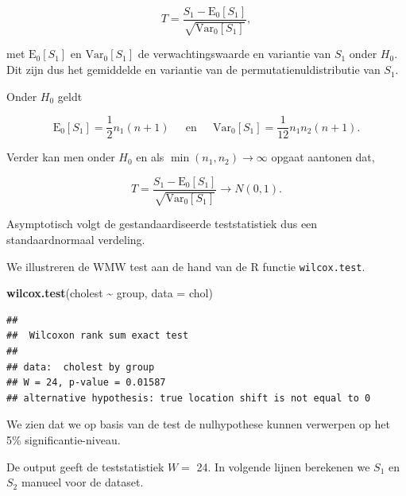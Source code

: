 \documentclass[
  12pt,dutch]{book}
\newenvironment{Shaded}{\begin{snugshade}}{\end{snugshade}}
\newcommand{\AttributeTok}[1]{\textcolor[rgb]{0.13,0.29,0.53}{#1}}
\newcommand{\FunctionTok}[1]{\textcolor[rgb]{0.13,0.29,0.53}{\textbf{#1}}}
\newcommand{\NormalTok}[1]{#1}
\newcommand{\SpecialCharTok}[1]{\textcolor[rgb]{0.81,0.36,0.00}{\textbf{#1}}}
\theoremstyle{definition}
\theoremstyle{definition}
\theoremstyle{definition}
\theoremstyle{definition}
\theoremstyle{remark}
\begin{document}
\[
  T = \frac{S_1-\text{E}_{0}\left[S_1\right]}{\sqrt{\text{Var}_{0}\left[S_1\right]}},
\]

met \(\text{E}_{0}\left[S_1\right]\) en \(\text{Var}_{0}\left[S_1\right]\) de verwachtingswaarde en variantie van \(S_1\) onder \(H_0\). Dit zijn dus het gemiddelde en variantie van de permutatienuldistributie van \(S_1\).

Onder \(H_0\) geldt

\[
   \text{E}_{0}\left[S_1\right]= \frac{1}{2}n_1(n+1) \;\;\;\;\text{ en }\;\;\;\; \text{Var}_{0}\left[S_1\right]=\frac{1}{12}n_1n_2(n+1).
 \]

Verder kan men onder \(H_0\) en als \(\min(n_1,n_2)\rightarrow \infty\) opgaat aantonen dat,

\[
    T = \frac{S_1-\text{E}_{0}\left[S_1\right]}{\sqrt{\text{Var}_{0}\left[S_1\right]}} \rightarrow N(0,1).  
 \]

Asymptotisch volgt de gestandaardiseerde teststatistiek dus een standaardnormaal verdeling.

We illustreren de WMW test aan de hand van de R functie \texttt{wilcox.test}.

\begin{Shaded}
\begin{Highlighting}[]
\FunctionTok{wilcox.test}\NormalTok{(cholest }\SpecialCharTok{\textasciitilde{}}\NormalTok{ group, }\AttributeTok{data =}\NormalTok{ chol)}
\end{Highlighting}
\end{Shaded}

\begin{verbatim}
## 
##  Wilcoxon rank sum exact test
## 
## data:  cholest by group
## W = 24, p-value = 0.01587
## alternative hypothesis: true location shift is not equal to 0
\end{verbatim}

We zien dat we op basis van de test de nulhypothese kunnen verwerpen op het 5\% significantie-niveau.

De output geeft de teststatistiek \(W=\) 24.
In volgende lijnen berekenen we \(S_1\) en \(S_2\) manueel voor de dataset.
\end{document}

